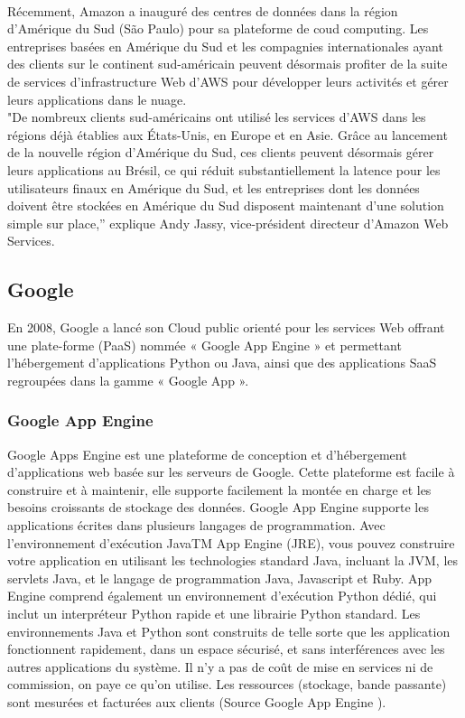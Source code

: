 \documentclass[a4paper,12pt]{report}
\begin{document}
\begin{onehalfspace}
	\paragraph*{}
	Récemment, Amazon a inauguré des centres de données dans la région d'Amérique du Sud (São Paulo) pour sa plateforme de coud computing. Les entreprises basées en Amérique du Sud et les compagnies internationales ayant des clients sur le continent sud-américain peuvent désormais profiter de la suite de services d'infrastructure Web d'AWS pour développer leurs activités et gérer leurs applications dans le nuage.\\
"De nombreux clients sud-américains ont utilisé les services d'AWS dans les régions déjà établies aux États-Unis, en Europe et en Asie. Grâce au lancement de la nouvelle région d'Amérique du Sud, ces clients peuvent désormais gérer leurs applications au Brésil, ce qui réduit substantiellement la latence pour les utilisateurs finaux en Amérique du Sud, et les entreprises dont les données doivent être stockées en Amérique du Sud disposent maintenant d'une solution simple sur place,” explique Andy Jassy, vice-président directeur d'Amazon Web Services.


	\subsection{Google}
	En 2008, Google a lancé son Cloud public orienté pour les services Web offrant une plate-forme (PaaS) nommée « Google App Engine » et permettant l'hébergement d'applications Python ou Java, ainsi que des applications SaaS regroupées dans la gamme « Google App ».

	\subsubsection*{Google App Engine}
	Google Apps Engine est une plateforme de conception et d’hébergement d’applications web basée sur les serveurs de Google. Cette plateforme est facile à construire et à maintenir, elle supporte facilement la montée en charge et les besoins croissants de stockage des données. Google App Engine supporte les applications écrites dans plusieurs langages de programmation. Avec l'environnement d'exécution JavaTM App Engine (JRE), vous pouvez construire votre application en utilisant les technologies standard Java, incluant la JVM, les servlets Java, et le langage de programmation Java, Javascript et Ruby. App Engine comprend également un environnement d'exécution Python dédié, qui inclut un interpréteur Python rapide et une librairie Python standard. Les environnements Java et Python sont construits de telle sorte que les application fonctionnent rapidement, dans un espace sécurisé, et sans interférences avec les autres applications du système. Il n’y a pas de coût de mise en services ni de commission, on paye ce qu’on utilise. Les ressources (stockage, bande passante) sont mesurées et facturées aux clients (Source Google App Engine \cite{source:ggappengine}).


\end{onehalfspace}
\end{document}
